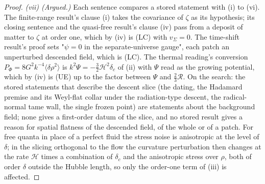 \begin{proof}
\emph{(vii) (Argued.)} Each sentence compares a stored statement with (i) to (vi). The finite-range result's clause (i) takes the covariance of $\zeta$ as its hypothesis; its closing sentence and the quasi-free result's clause (iv) pass from a deposit of matter to $\zeta$ at order one, which by (iv) is (LC) with $v_{\Sigma} = 0$. The time-shift result's proof sets "$\psi = 0$ in the separate-universe gauge", each patch an unperturbed descended field, which is (LC). The thermal reading's conversion $P_{\Phi} = 8G^{2}k^{-4}\langle\delta\rho^{2}\rangle$ is $k^{2}\Psi = -\tfrac32\mathcal{H}^{2}\delta_{c}$ of (ii) with $\Psi$ read as the growing potential, which by (iv) is (UE) up to the factor between $\Psi$ and $\tfrac23\mathcal{R}$. On the search: the stored statements that describe the descent slice (the dating, the Hadamard premise and its Weyl-flat collar under the radiation-type descent, the radical-normal tame wall, the single frozen point) are statements about the background field; none gives a first-order datum of the slice, and no stored result gives a reason for spatial flatness of the descended field, of the whole or of a patch. For free quanta in place of a perfect fluid the stress noise is anisotropic at the level of $\delta$; in the slicing orthogonal to the flow the curvature perturbation then changes at the rate $\mathcal{H}$ times a combination of $\delta_{c}$ and the anisotropic stress over $\rho$, both of order $\delta$ outside the Hubble length, so only the order-one term of (iii) is affected.
\end{proof}
